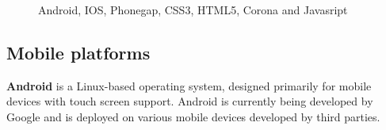 \begin{figure}[!ht]
{}
\caption{Android, IOS, Phonegap, CSS3, HTML5, Corona and Javasript}
\end{figure}

\subsection{Mobile platforms}
{\bf Android} is a Linux-based operating system, designed primarily for mobile
devices with touch screen support. Android is currently being developed by
Google and is deployed on various mobile devices developed by third parties.
\cite{android}
\linebreak

